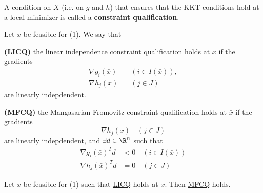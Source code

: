 \label{e8fa554}

A condition on $X$ (i.e. on $g$ and $h$) that ensures that the KKT
conditions hold at a local minimizer is called a \textbf{constraint
	qualification}.


\label{fed784a}

Let $\bar x$ be feasible for (1). We say that
\begin{enumerata}
	\item \textbf{(LICQ)} the linear independence constraint
	qualification holds at $\bar x$ if the gradients
	\begin{align*}
		\nabla g_i(\bar x) & \quad(i\in I(\bar x)), \\
		\nabla h_j(\bar x) & \quad(j\in J)
	\end{align*}
	are linearly indepdendent.
	\item \textbf{(MFCQ)} the Mangasarian-Fromovitz constraint
	qualification holds at $\bar x$ if the gradients
	$$
		\nabla h_j(\bar x)\quad(j\in J)
	$$
	are linearly indepdendent, and $\exists d\in\R^n$ such that
	\begin{align*}
		\nabla g_i(\bar x)^Td & <0\quad(i\in I(\bar x)) \\
		\nabla h_j(\bar x)^Td & =0\quad(j\in J)
	\end{align*}
\end{enumerata}

\label{a7ef3f5}

Let $\bar x$ be feasible for (1) such that \href{fed784a}{LICQ} holds
at $\bar x$. Then \href{fed784a}{MFCQ} holds.




